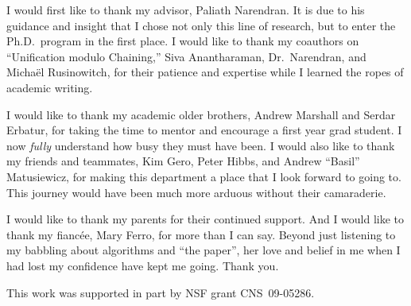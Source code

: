 I would first like to thank my advisor, Paliath Narendran. It is due to his
guidance and insight that I chose not only this line of research, but to enter
the Ph.D.\ program in the first place. I would like to thank my coauthors on
``Unification modulo Chaining,'' Siva Anantharaman, Dr.\ Narendran, and
Micha\"{e}l Rusinowitch, for their patience and expertise while I learned the
ropes of academic writing.

I would like to thank my academic older brothers, Andrew Marshall and Serdar
Erbatur, for taking the time to mentor and encourage a first year grad student.
I now \emph{ful{}ly} understand how busy they must have been. I would also like
to thank my friends and teammates, Kim Gero, Peter Hibbs, and Andrew ``Basil''
Matusiewicz, for making this department a place that I look forward to going
to. This journey would have been much more arduous without their camaraderie.

I would like to thank my parents for their continued support. And I would like
to thank my fianc\'{e}e, Mary Ferro, for more than I can say. Beyond just
listening to my babbling about algorithms and ``the paper'', her love and
belief in me when I had lost my confidence have kept me going. Thank you.

\vspace{1em}
This work was supported in part by NSF grant CNS~09-05286.

